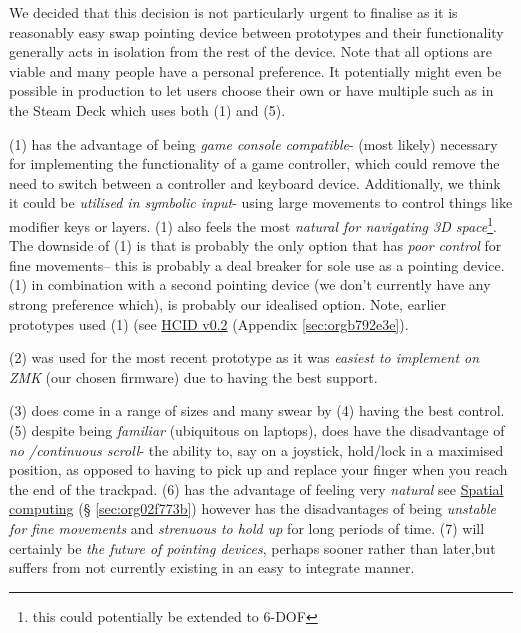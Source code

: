 \documentclass[logo,bsc,singlespacing,parskip]{infthesis}
\begin{document}
We decided that this decision is not particularly urgent to finalise as it is reasonably easy swap pointing device between prototypes and their functionality generally acts in isolation from the rest of the device.
Note that all options are viable and many people have a personal preference.
It potentially might even be possible in production to let users choose their own or have multiple such as in the Steam Deck \autocite{SteamDeck2022}  which uses both (1) and (5).

(1) has the advantage of being \emph{game console compatible}- (most likely) necessary for implementing the functionality of a game controller, which could remove the need to switch between a controller and keyboard device.
Additionally, we think it could be \emph{utilised in symbolic input}- using large movements to control things like modifier keys or layers.
(1) also feels the most \emph{natural for navigating 3D space}\footnote{this could potentially be extended to 6-DOF}.
The downside of (1) is that is probably the only option that has \emph{poor control} for fine movements-- this is probably a deal breaker for sole use as a pointing device.
(1) in combination with a second pointing device (we don't currently have any strong preference which), is probably our idealised option.
Note, earlier prototypes used (1) (see \hyperref[sec:orgb792e3e]{HCID v0.2} (Appendix \ref{sec:orgb792e3e}).

(2) was used for the most recent prototype as it was \emph{easiest to implement on ZMK} (our chosen firmware) due to having the best support.

(3) does come in a range of sizes and many swear by (4) having the best control.
(5) despite being \emph{familiar} (ubiquitous on laptops), does have the disadvantage of \emph{no /continuous scroll}- the ability to, say on a joystick, hold/lock in a maximised position, as opposed to having to pick up and replace your finger when you reach the end of the trackpad.
(6) has the advantage of feeling very \emph{natural} see \hyperref[sec:org02f773b]{Spatial computing} (§ \ref{sec:org02f773b}) however has the disadvantages of being \emph{unstable for fine movements} and \emph{strenuous to hold up} for long periods of time.
(7) will certainly be \emph{the future of pointing devices}, perhaps sooner rather than later,but suffers from not currently existing in an easy to integrate manner.
\end{document}
